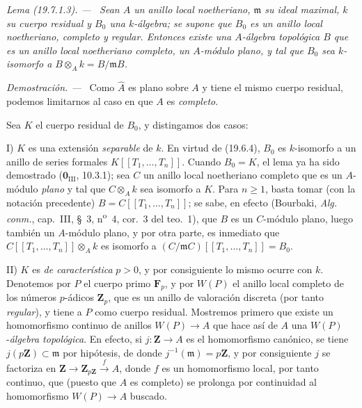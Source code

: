 \documentclass[10pt,oneside]{book}
\makeatletter
\newcommand{\setmanualcurrentlabel}[1]{\def\@currentlabel{#1}}
\newenvironment{lemma}[1][]{%
  \setmanualcurrentlabel{#1}\par\medskip\noindent\itshape Lema (#1). ---\ }{\par}
\newenvironment{proof}{%
  \par\medskip\noindent\textit{Demostración. ---\ }}{\par}
\makeatother
\begin{document}
\begin{lemma}[19.7.1.3]
\label{0.19.7.1.3-es}
Sean $A$ un anillo local noetheriano, $\mathfrak m$ su ideal maximal, $k$ su
cuerpo residual y $B_0$ una $k$-álgebra; se supone que $B_0$ es un anillo
local noetheriano, completo y \textup{regular}. Entonces existe una $A$-álgebra
topológica $B$ que es un anillo local noetheriano completo, un $A$-módulo \textup{plano},
y tal que $B_0$ sea $k$-isomorfo a
$B\otimes_A k=B/\mathfrak mB$.
\end{lemma}

\begin{proof}
Como $\widehat A$ es plano sobre $A$ y tiene el mismo cuerpo residual, podemos limitarnos
al caso en que $A$ es \emph{completo}.

Sea $K$ el cuerpo residual de $B_0$, y distingamos dos casos:

\medskip
\noindent I) $K$ es una extensión \emph{separable} de $k$. En virtud de
(19.6.4), $B_0$ es $k$-isomorfo a un anillo de series formales
$K[[T_1,\ldots,T_n]]$. Cuando $B_0=K$, el lema ya ha sido demostrado
($\mathbf 0_{\mathrm{III}}$, 10.3.1); sea $C$ un anillo local noetheriano
completo que es un $A$-módulo \emph{plano} y tal que $C\otimes_A k$ sea isomorfo a
$K$. Para $n\geq1$, basta tomar (con la notación precedente)
$B=C[[T_1,\ldots,T_n]]$; se sabe, en efecto (Bourbaki,
\emph{Alg. conm.}, cap.~III, §~3, n\textsuperscript{o}~4, cor.~3 del teo.~1),
que $B$ es un $C$-módulo plano, luego también un $A$-módulo plano, y por otra parte,
es inmediato que $C[[T_1,\ldots,T_n]]\otimes_A k$ es isomorfo a
$(C/\mathfrak mC)[[T_1,\ldots,T_n]]=B_0$.

\medskip
\noindent II) $K$ es \emph{de característica} $p>0$, y por consiguiente lo mismo
ocurre con $k$. Denotemos por $P$ el cuerpo primo $\mathbf F_p$, y por $W(P)$ el anillo
local completo de los números $p$-ádicos $\mathbf Z_p$, que es un anillo de
valoración discreta (por tanto \emph{regular}), y tiene a $P$ como cuerpo residual.
Mostremos primero que existe un homomorfismo continuo de anillos $W(P)\to A$
que hace así de $A$ una $W(P)$-\emph{álgebra topológica}. En efecto, si
$j:\mathbf Z\to A$ es el homomorfismo canónico, se tiene
$j(p\mathbf Z)\subset\mathfrak m$ por hipótesis, de donde
$j^{-1}(\mathfrak m)=p\mathbf Z$, y por consiguiente $j$ se factoriza en
$\mathbf Z\to\mathbf Z_{p\mathbf Z}\xrightarrow{f}A$, donde $f$ es un
homomorfismo local, por tanto continuo, que (puesto que $A$ es completo) se prolonga
por continuidad al homomorfismo $W(P)\to A$ buscado.


\end{proof}
\end{document}
